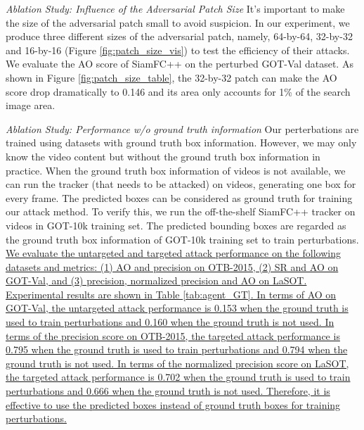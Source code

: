 \documentclass[journal]{IEEEtran}
\begin{document}
\textit{Ablation Study: Influence of the Adversarial Patch Size} 
It's important to make the size of the adversarial patch small to avoid suspicion. In our experiment, we produce three different sizes of the adversarial patch, namely, 64-by-64, 32-by-32 and 16-by-16 (Figure \ref{fig:patch_size_vis}) to test the efficiency of their attacks. We evaluate the AO score of SiamFC++ on the perturbed GOT-Val dataset.
As shown in Figure \ref{fig:patch_size_table}, the 32-by-32 patch can make the AO score drop dramatically to 0.146 and its area only accounts for 1\% of the search image area.

\textit{Ablation Study: Performance w/o ground truth information} Our perterbations are trained using datasets with ground truth box information.
However, we may only know the video content but without the ground truth box information in practice. When the ground truth box information of videos is not available, we can run the tracker (that needs to be attacked) on videos, generating one box for every frame. The predicted boxes can be considered as ground truth for training our attack method. To verify this, we run the off-the-shelf SiamFC++ tracker on videos in GOT-10k training set. The predicted bounding boxes are regarded as the ground truth box information of GOT-10k training set to train perturbations.
\uline{We evaluate the untargeted and targeted attack performance on the following datasets and metrics: (1) AO and precision on OTB-2015, (2) SR and AO on GOT-Val, and (3) precision, normalized precision and AO on LaSOT.
Experimental results are shown in Table \ref{tab:agent_GT}.
In terms of AO on GOT-Val, the untargeted attack performance is 0.153 when the ground truth is used to train perturbations and 0.160 when the ground truth is not used.
In terms of the precision score on OTB-2015, the targeted attack performance is 0.795 when the ground truth is used to train perturbations and 0.794 when the ground truth is not used.
In terms of the normalized precision score on LaSOT, the targeted attack performance is 0.702 when the ground truth is used to train perturbations and 0.666 when the ground truth is not used.
Therefore, it is effective to use the predicted boxes instead of ground truth boxes for training perturbations.
}
\end{document}
